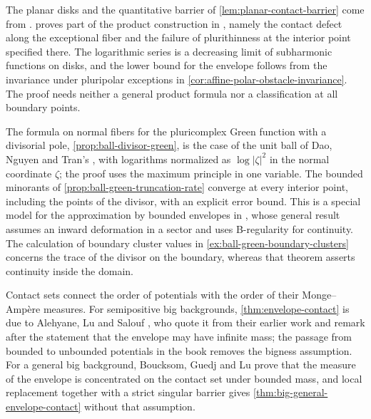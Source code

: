 The planar disks and the quantitative barrier of \cref{lem:planar-contact-barrier} come from \cite[v1, Lemma~6.1, pp.~12--13]{NarzillaevWeighted26}.  proves part of the product construction in \cite[v1, Lemma~6.2, pp.~13--14]{NarzillaevWeighted26}, namely the contact defect along the exceptional fiber and the failure of plurithinness at the interior point specified there. The logarithmic series is a decreasing limit of subharmonic functions on disks, and the lower bound for the envelope follows from the invariance under pluripolar exceptions in \cref{cor:affine-polar-obstacle-invariance}. The proof needs neither a general product formula nor a classification at all boundary points.

The formula on normal fibers for the pluricomplex Green function with a divisorial pole, \cref{prop:ball-divisor-green}, is the case of the unit ball of Dao, Nguyen and Tran's \cite[v1, Proposition~4.2, p.~25]{DNTGreen26}, with logarithms normalized as $\log|\zeta|^2$ in the normal coordinate $\zeta$; the proof uses the maximum principle in one variable. The bounded minorants of \cref{prop:ball-green-truncation-rate} converge at every interior point, including the points of the divisor, with an explicit error bound. This is a special model for the approximation by bounded envelopes in \cite[v1, Theorem~1.7, p.~5]{DNTGreen26}, whose general result assumes an inward deformation in a sector and uses B-regularity for continuity. The calculation of boundary cluster values in \cref{ex:ball-green-boundary-clusters} concerns the trace of the divisor on the boundary, whereas that theorem asserts continuity inside the domain.

Contact sets connect the order of potentials with the order of their Monge--Amp\`ere measures. For semipositive big backgrounds, \cref{thm:envelope-contact} is due to Alehyane, Lu and Salouf \cite[Theorem~2.2, p.~8]{ALS26}, who quote it from their earlier work and remark after the statement that the envelope may have infinite mass; the passage from bounded to unbounded potentials in the book removes the bigness assumption. For a general big background, Boucksom, Guedj and Lu \cite[Theorem 2.9 and Proposition 2.11]{BGL25} prove that the measure of the envelope is concentrated on the contact set under bounded mass, and local replacement together with a strict singular barrier gives \cref{thm:big-general-envelope-contact} without that assumption.

